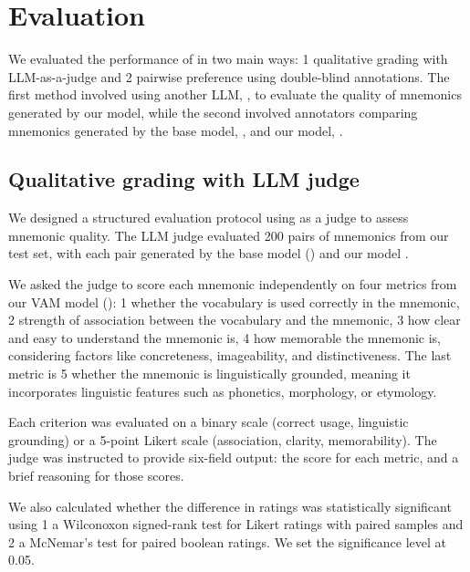 \section{Evaluation} \label{sec:evaluation}
We evaluated the performance of \linksys in two main ways: \numlist{1} qualitative grading with LLM-as-a-judge and \numlist{2} pairwise preference using double-blind annotations. The first method involved using another LLM, \judgemodel, to evaluate the quality of mnemonics generated by our model, while the second involved annotators comparing mnemonics generated by the base model, \studentmodel, and our model, \linksys.



\subsection{Qualitative grading with LLM judge} \label{sec:qualitative-llm-judge}

We designed a structured evaluation protocol using \judgemodel as a judge to assess mnemonic quality. The LLM judge evaluated 200 pairs of mnemonics from our test set, with each pair generated by the base model (\studentmodel) and our model \linksys.

We asked the judge to score each mnemonic independently on four metrics from our VAM model ():
\numlist{1} whether the vocabulary is used correctly in the mnemonic,
\numlist{2} strength of association between the vocabulary and the mnemonic,
\numlist{3} how clear and easy to understand the mnemonic is,
\numlist{4} how memorable the mnemonic is, considering factors like concreteness, imageability, and distinctiveness. The last metric is \numlist{5} whether the mnemonic is linguistically grounded, meaning it incorporates linguistic features such as phonetics, morphology, or etymology.

Each criterion was evaluated on a binary scale (correct usage, linguistic grounding) or a 5-point Likert scale (association, clarity, memorability). The judge was instructed to provide six-field output: the score for each metric, and a brief reasoning for those scores.

We also calculated whether the difference in ratings was statistically significant using \numlist{1} a Wilconoxon signed-rank test for Likert ratings with paired samples and \numlist{2} a McNemar's test for paired boolean ratings. We set the significance level at 0.05.

